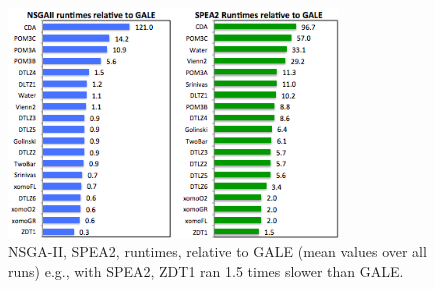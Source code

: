 \documentclass[10pt,journal,compsoc]{IEEEtran}
\begin{document}
\begin{figure}[!b]
\includegraphics[width=3.45in]{barcharts_runtime_relativeToGale_v2.png}
\caption{NSGA-II, SPEA2, runtimes, relative to GALE (mean values
over all runs) e.g.,
with SPEA2, ZDT1 ran 1.5 times slower than GALE.}\label{fig:runSpea2} 
\end{figure}
\end{document}
